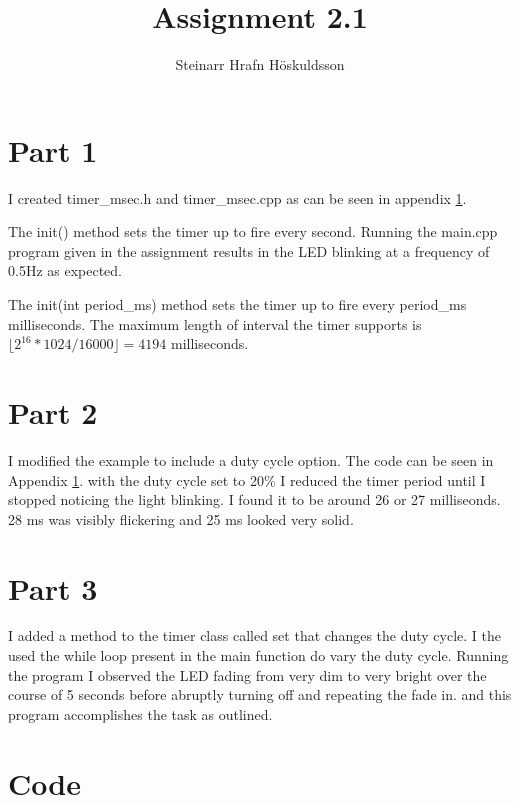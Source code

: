 \documentclass{article}
\title{Assignment 2.1}
\author{Steinarr Hrafn Höskuldsson}
\begin{document}
\pagestyle{firststyle}
{\let\newpage\relax\maketitle}
\section*{Part 1}

I created timer\_msec.h and timer\_msec.cpp as can be seen in appendix \ref{appendix:code}.
\newline

The init() method sets the timer up to fire every second.
Running the main.cpp program given in the assignment results in the LED blinking at a frequency of 0.5Hz as expected. 
\newline

The init(int period\_ms) method sets the timer up to fire every period\_ms milliseconds. 
The maximum length of interval the timer supports is \(\lfloor 2^{16}*1024 / 16000\rfloor = 4194\) milliseconds.

\section*{Part 2}
I modified the example to include a duty cycle option. The code can be seen in Appendix \ref{appendix:code}.
\newline
with the duty cycle set to 20\% I reduced  the timer period until I stopped noticing the light blinking. I found it to be around 26 or 27 milliseonds. 28 ms was visibly flickering and 25 ms looked very solid.
\newpage
\section*{Part 3}
I added a method to the timer class called set that changes the duty cycle.
I the used the while loop present in the main function do vary the duty cycle. Running the program I observed the LED fading from very dim to very bright over the course of 5 seconds before abruptly turning off and repeating the fade in. 
\newpage
and this program accomplishes the task as outlined.

\appendix
\section{Code}\label{appendix:code}





\end{document}
